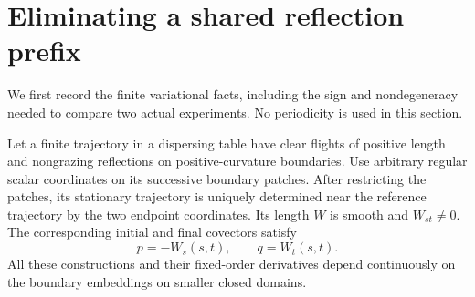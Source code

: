 \section{Eliminating a shared reflection prefix}
\label{sec:v77-prefix}

We first record the finite variational facts, including the sign and
nondegeneracy needed to compare two actual experiments.  No periodicity
is used in this section.

\begin{lemma}\label{lem:v77-regular-action}
Let a finite trajectory in a dispersing table have clear flights of
positive length and nongrazing reflections on positive-curvature
boundaries.  Use arbitrary regular scalar coordinates on its successive
boundary patches.  After restricting the patches, its stationary
trajectory is uniquely determined near the reference trajectory by the
two endpoint coordinates.  Its length $W$ is smooth and $W_{st}\ne0$.
The corresponding initial and final covectors satisfy
\[
 p=-W_s(s,t),\qquad q=W_t(s,t).
\]
All these constructions and their fixed-order derivatives depend
continuously on the boundary embeddings on smaller closed domains.
\end{lemma}
